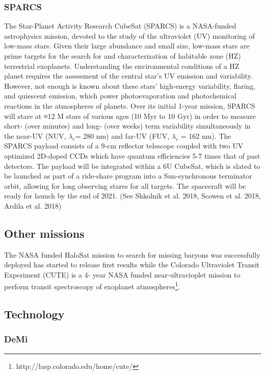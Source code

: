\documentclass[12pt]{article}
\begin{document}
\subsubsection{SPARCS}
The Star-Planet Activity Research CubeSat (SPARCS) is a NASA-funded astrophysics mission, devoted to the study of the ultraviolet (UV) monitoring of low-mass stars. Given their large abundance and small size, low-mass stars are prime targets for the search for and characterization of habitable zone (HZ) terrestrial exoplanets. Understanding the environmental conditions of a HZ planet requires the assessment of the central star’s UV emission and variability. However, not enough is known about these stars’ high-energy variability, flaring, and quiescent emission, which power photoevaporation and photochemical reactions in the atmospheres of planets. Over its initial 1-year mission, SPARCS will stare at ≈12 M stars of various ages (10 Myr to 10 Gyr) in order to measure short- (over minutes) and long- (over weeks) term variability simultaneously in the near-UV (NUV, $\lambda_c$= 280 nm) and far-UV (FUV, $\lambda_c$  = 162 nm). The SPARCS payload consists of a 9-cm reflector telescope coupled with two UV optimized 2D-doped CCDs which have quantum efficiencies 5-7 times that of past detectors. The payload will be integrated within a 6U CubeSat, which is slated to be launched as part of a ride-share program into a Sun-synchronous terminator orbit, allowing for long observing stares for all targets. The spacecraft will be ready for launch by the end of 2021. (See Shkolnik et al. 2018, Scowen et al. 2018, Ardila et al. 2018)

\subsection{Other missions}
The NASA funded HaloSat mission  to search for missing baryons was successfully deployed has started to release first results \cite{2019AAS...23346206J} while the Colorado Ultraviolet Transit Experiment (CUTE) is a 4- year NASA funded near-ultravioplet mission to perform transit spectroscopy of exoplanet atmospheres\footnote{http://lasp.colorado.edu/home/cute/}.

\subsection{Technology}
\subsubsection{DeMi}
\end{document}

